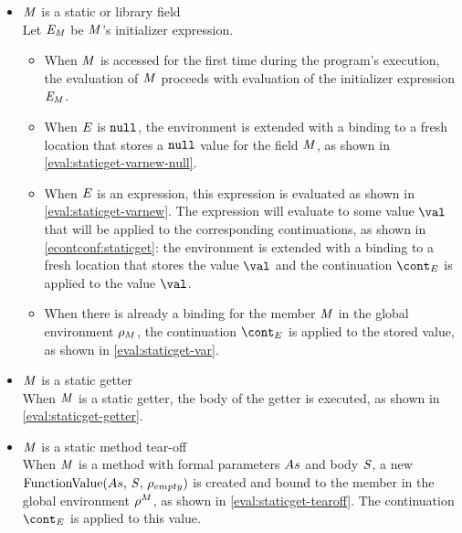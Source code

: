\documentclass[a4paper,oneside]{article}
\begin{document}
\begin{itemize}
    \item $\mathit{M}$ is a static or library field\\
        Let $\mathit{E}_{\mathit{M}}$ be $\mathit{M}$'s initializer expression.
        \begin{itemize}
            \item When $\mathit{M}$ is accessed for the first time during the program's execution, the evaluation of $\mathit{M}$ proceeds with evaluation of the initializer expression $\mathit{E}_{\mathit{M}}$.
            \item When $\mathit{E}$ is $\tt{null}$, the environment is extended with a binding to a fresh location that stores a $\tt{null}$ value for the field $\mathit{M}$, as shown in \eqref{eval:staticget-varnew-null}.
            \item When $\mathit{E}$ is an expression, this expression is evaluated as shown in \eqref{eval:staticget-varnew}.
                The expression will evaluate to some value $\val$ that will be applied to the corresponding continuations, as shown in \eqref{econtconf:staticget}: the environment is extended with a binding to a fresh location that stores the value $\val$ and the continuation $\econt$ is applied to the value $\val$.
            \item When there is already a binding for the member $\mathit{M}$ in the global environment $\rho_{M}$, the continuation $\econt$ is applied to the stored value, as shown in \eqref{eval:staticget-var}.
        \end{itemize}

    \item $\mathit{M}$ is a static getter\\
        When $\mathit{M}$ is a static getter, the body of the getter is executed, as shown in \eqref{eval:staticget-getter}.

    \item $\mathit{M}$ is a static method tear-off\\
        When $\mathit{M}$ is a method with formal parameters $As$ and body $\mathit{S}$, a new $\mathrm{FunctionValue}({As},\,{\mathit{S}},\,{\rho_{empty}})$ is created and bound to the member in the global environment $\rho^{M}$, as shown in \eqref{eval:staticget-tearoff}.
        The continuation $\econt$ is applied to this value.

\end{itemize}
\end{document}
